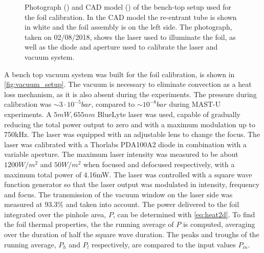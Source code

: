 \begin{figure}
\begin{subfigure}{0.8\linewidth}
        \vspace*{-5mm}
        {\color{white}\caption{\phantom{ }}\label{fig:vacuum_setup2}}
     \end{subfigure}
        \vspace*{+5mm}
        \caption{Photograph () and CAD model () of the bench-top setup used for the foil calibration. In the CAD model the re-entrant tube is shown in white and the foil assembly is on the left side. The photograph, taken on 02/08/2018, shows the laser used to illuminate the foil, as well as the diode and aperture used to calibrate the laser and vacuum system.}
        \label{fig:vacuum_setup}
\end{figure}


A bench top vacuum system was built for the foil calibration, is shown in \autoref{fig:vacuum_setup}. The vacuum is necessary to eliminate convection as a heat loss mechanism, as it is also absent during the experiments. The pressure during calibration was $\sim 3 \cdot 10^{-5}bar$, compared to $\sim 10^{-8}bar$ during MAST-U experiments.
A $5mW, 655nm$ BlueLyte laser was used, capable of gradually reducing the total power output to zero and with a maximum modulation up to 750kHz. The laser was equipped with an adjustable lens to change the focus. The laser was calibrated with a Thorlabs PDA100A2 diode in combination with a variable aperture. The maximum laser intensity was measured to be about $1200W/m^2$ and $50W/m^2$ when focused and defocused respectively, with a maximum total power of 4.16mW. The laser was controlled with a square wave function generator so that the laser output was modulated in intensity, frequency and focus. The transmission of the vacuum window on the laser side was measured at $93.3\%$ and taken into account. The power delivered to the foil integrated over the pinhole area, $P$, can be determined with \autoref{eq:heat2d}. To find the foil thermal properties, the the running average of $P$ is computed, averaging over the duration of half the square wave duration. The peaks and troughs of the running average, $P_h$ and $P_l$ respectively, are compared to the input values $P_{in}$.

